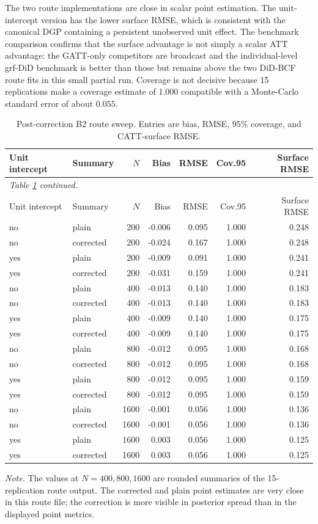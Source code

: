 \documentclass[11pt]{article}
\begin{document}
The two route implementations are close in scalar point estimation. The
unit-intercept version has the lower surface RMSE, which is consistent with
the canonical DGP containing a persistent unobserved unit effect. The
benchmark comparison confirms that the surface advantage is not simply a
scalar ATT advantage: the GATT-only competitors are broadcast and the
individual-level grf-DiD benchmark is better than those but remains above the
two DiD-BCF route fits in this small partial run. Coverage is not decisive
because 15 replications make a coverage estimate of 1.000 compatible with a
Monte-Carlo standard error of about $0.055$.

\begin{longtable}{llrrrrr}
\caption{Post-correction B2 route sweep. Entries are bias, RMSE, 95\% coverage,
and CATT-surface RMSE.}\label{tab:route-sweep}\\
\toprule
Unit intercept & Summary & $N$ & Bias & RMSE & Cov.95 & Surface RMSE \\
\midrule
\endfirsthead
\multicolumn{7}{l}{\emph{\footnotesize Table \ref{tab:route-sweep} continued.}}\\
\toprule
Unit intercept & Summary & $N$ & Bias & RMSE & Cov.95 & Surface RMSE \\
\midrule
\endhead
\bottomrule
\endlastfoot
no & plain & 200 & -0.006 & 0.095 & 1.000 & 0.248 \\
no & corrected & 200 & -0.024 & 0.167 & 1.000 & 0.248 \\
yes & plain & 200 & -0.009 & 0.091 & 1.000 & 0.241 \\
yes & corrected & 200 & -0.031 & 0.159 & 1.000 & 0.241 \\
no & plain & 400 & -0.013 & 0.140 & 1.000 & 0.183 \\
no & corrected & 400 & -0.013 & 0.140 & 1.000 & 0.183 \\
yes & plain & 400 & -0.009 & 0.140 & 1.000 & 0.175 \\
yes & corrected & 400 & -0.009 & 0.140 & 1.000 & 0.175 \\
no & plain & 800 & -0.012 & 0.095 & 1.000 & 0.168 \\
no & corrected & 800 & -0.012 & 0.095 & 1.000 & 0.168 \\
yes & plain & 800 & -0.012 & 0.095 & 1.000 & 0.159 \\
yes & corrected & 800 & -0.012 & 0.095 & 1.000 & 0.159 \\
no & plain & 1600 & -0.001 & 0.056 & 1.000 & 0.136 \\
no & corrected & 1600 & -0.001 & 0.056 & 1.000 & 0.136 \\
yes & plain & 1600 & 0.003 & 0.056 & 1.000 & 0.125 \\
yes & corrected & 1600 & 0.003 & 0.056 & 1.000 & 0.125 \\
\end{longtable}
\noindent\emph{Note.} The values at $N=400,800,1600$ are rounded summaries of the
15-replication route output. The corrected and plain point estimates are very
close in this route file; the correction is more visible in posterior spread
than in the displayed point metrics.
\end{document}
